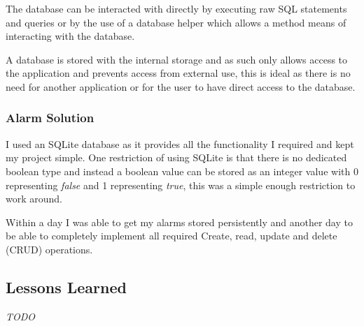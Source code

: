 The database can be interacted with directly by executing raw SQL
statements and queries or by the use of a database helper which allows a
method means of interacting with the database.

A database is stored with the internal storage and as such only allows
access to the application and prevents access from external use, this is
ideal as there is no need for another application or for the user to
have direct access to the database.

\subsubsection{Alarm Solution}\label{alarm-solution}

I used an SQLite database as it provides all the functionality I
required and kept my project simple. One restriction of using SQLite is
that there is no dedicated boolean type and instead a boolean value can
be stored as an integer value with 0 representing \emph{false} and 1
representing \emph{true}, this was a simple enough restriction to work
around.

Within a day I was able to get my alarms stored persistently and another
day to be able to completely implement all required Create, read, update
and delete (CRUD) operations.

\subsection{Lessons Learned}\label{lessons-learned}

\emph{TODO}
